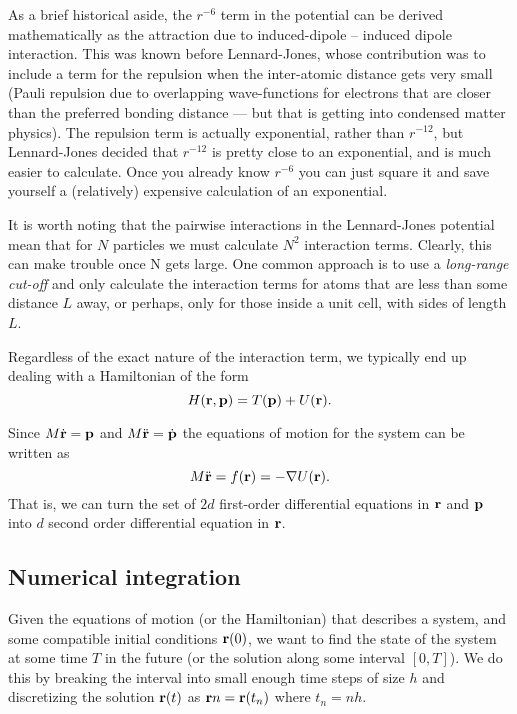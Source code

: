 \documentclass{article}
\begin{document}
As a brief historical aside, the $r^{-6}$ term in the potential can be derived mathematically as the attraction due to induced-dipole -- induced dipole interaction. This was known before Lennard-Jones, whose contribution was to include a term for the repulsion when the inter-atomic distance gets very small (Pauli repulsion due to overlapping wave-functions for electrons that are closer than the preferred bonding distance --- but that is getting into condensed matter physics). The repulsion term is actually exponential, rather than $r^{-12}$, but Lennard-Jones decided that $r^{-12}$ is pretty close to an exponential, and is much easier to calculate. Once you already know $r^{-6}$ you can just square it and save yourself a (relatively) expensive calculation of an exponential.

It is worth noting that the pairwise interactions in the Lennard-Jones potential mean that for $N$ particles we must calculate $N^2$ interaction terms. Clearly, this can make trouble once N gets large. One common approach is to use a \emph{long-range cut-off} and only calculate the interaction terms for atoms that are less than some distance $L$ away, or perhaps, only for those inside a unit cell, with sides of length $L$.

Regardless of the exact nature of the interaction term, we typically end up dealing with a Hamiltonian of the form 
$$
	H({\bf r},{\bf p}) = T({\bf p}) + U({\bf r}).
$$

Since $M\dot{\bf r} = {\bf p}$ and $M\ddot{\bf r} = \dot{\bf p}$ the equations of motion for the system can be written as
\begin{equation}
	M\ddot{\bf r} = f({\bf r}) = -\nabla U({\bf r}).
	\label{eq:2vf}
\end{equation}
That is, we can turn the set of $2d$ first-order differential equations in ${\bf r}$ and ${\bf p}$ into $d$ second order differential equation in ${\bf r}$.

\subsection*{Numerical integration}
Given the equations of motion (or the Hamiltonian) that describes a system, and some compatible initial conditions ${\bf r}(0)$, we want to find the state of the system at some time $T$ in the future (or the solution along some interval $[0,T]$). We do this by breaking the interval into small enough time steps of size $h$ and discretizing the solution ${\bf r}(t)$ as ${\bf r}n = {\bf r}(t_n) $ where $t_n = nh$.
\end{document}
